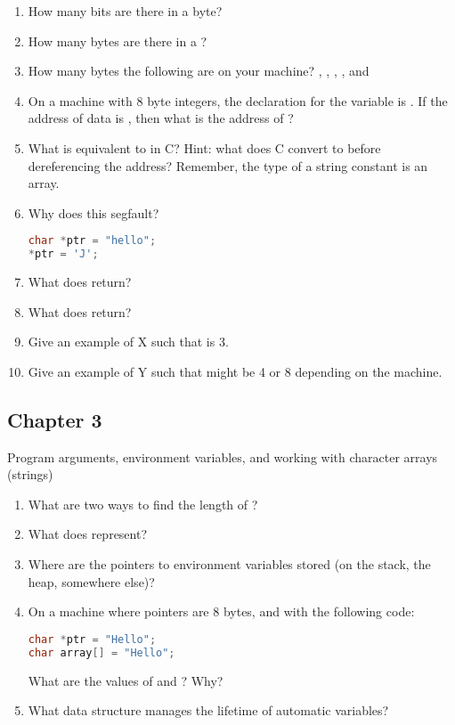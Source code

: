 \begin{enumerate}
\item How many bits are there in a byte?
\item How many bytes are there in a ?
\item How many bytes the following are on your machine? , , , , and 
\item On a machine with 8 byte integers, the declaration for the variable  is .
If the address of data is , then what is the address of ?
\item What is  equivalent to in C? Hint: what does C convert  to before dereferencing the address?
Remember, the type of a string constant  is an array.
\item Why does this segfault?
\begin{lstlisting}[language=C]
char *ptr = "hello";
*ptr = 'J';
\end{lstlisting}
\item What does  return?
\item What does  return?
\item Give an example of X such that  is 3.
\item Give an example of Y such that  might be 4 or 8 depending on the machine.
\end{enumerate}

\subsection{Chapter 3}

Program arguments, environment variables, and working with character arrays (strings)

\begin{enumerate}
\item What are two ways to find the length of ?
\item What does  represent?
\item Where are the pointers to environment variables stored (on the stack, the heap, somewhere else)?
\item On a machine where pointers are 8 bytes, and with the following code:
\begin{lstlisting}[language=C]
char *ptr = "Hello";
char array[] = "Hello";
\end{lstlisting}
What are the values of  and ? Why?
\item What data structure manages the lifetime of automatic variables?
\end{enumerate}


